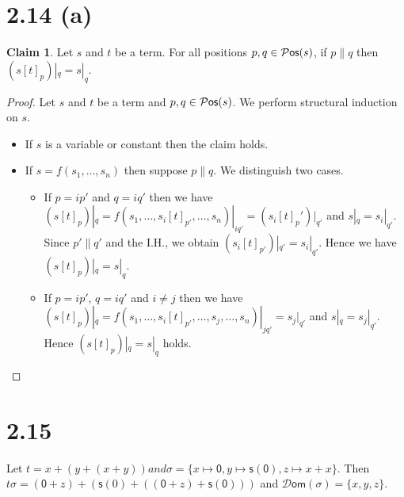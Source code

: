 \documentclass[autodetect-enginem]{article}
\theoremstyle{plain}
\theoremstyle{definition}
\theoremstyle{definition}
\newtheorem*{claim}{Claim}
\newcommand{\m}[1]{\mathsf{#1}}
\begin{document}
\section*{2.14 (a)}

\begin{claim}
    Let $s$ and $t$ be a term.
    For all positions $p,q \in \mathcal{P}\mathsf{os}(s)$, if $p \parallel q$ then $(s[t]_p)|_q = s|_q$. 
\end{claim}

\begin{proof}
    Let $s$ and $t$ be a term and $p,q \in \mathcal{P}\mathsf{os}(s)$.
    We perform structural induction on $s$.
    \begin{itemize}
        \item If $s$ is a variable or constant then the claim holds.
        \item If $s = f(s_1,\dots,s_n)$ then suppose $p \parallel q$.
        We distinguish two cases.
            \begin{itemize}
                \item If $p = ip'$ and $q = iq'$ then
                    we have $(s[t]_p)|_q = f(s_1, \dots, s_i[t]_{p'}, \dots, s_n)|_{iq'} = (s_i[t]_p')|_{q'}$
                    and $s|_q = s_i|_{q'}$. Since $p' \parallel q'$ and the I.H., we obtain $(s_i[t]_{p'})|_{q'} = s_i|_{q'}$.
                    Hence we have $(s[t]_p)|_q = s|_q$.
                \item If $p = ip'$, $q = iq'$ and $i \neq j$ then
                    we have $(s[t]_p)|_q = f(s_1, \dots, s_i[t]_{p'}, \dots, s_j, \dots, s_n)|_{jq'}
                    = s_j|_{q'}$ and $s|_q = s_j|_{q'}$.
                    Hence $(s[t]_p)|_q = s|_q$ holds.
            \end{itemize}
    \end{itemize}
\end{proof}

\section*{2.15}
Let $t = x + (y + (x + y)) and \sigma = \{x \mapsto \m{0}, y \mapsto \m{s}(\m{0}), z \mapsto x + x\}$.
Then $t\sigma = (\m{0} + z) + (\m{s}(0) + ((\m{0} + z) + \m{s}(\m{0})))$ and
$\mathcal{D}\mathsf{om}(\sigma) = \{x,y,z\}$.
\end{document}
